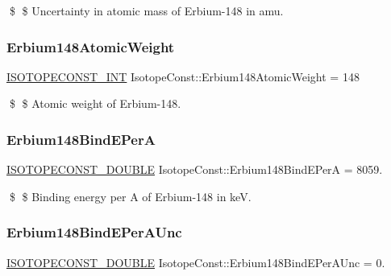 \$ \$ Uncertainty in atomic mass of Erbium-\/148 in amu. \mbox{\label{group___isotope_const-_erbium-_er148_ga8ebb9aed43184fc37fa10e8beffe3fc6}} 
\subsubsection{\texorpdfstring{Erbium148\+Atomic\+Weight}{Erbium148AtomicWeight}}
{\footnotesize\ttfamily \mbox{\hyperlink{group___isotope_const-_macros_ga5f18360b3e99483a35c32d789e62621c}{I\+S\+O\+T\+O\+P\+E\+C\+O\+N\+S\+T\+\_\+\+I\+NT}} Isotope\+Const\+::\+Erbium148\+Atomic\+Weight = 148}

\$ \$ Atomic weight of Erbium-\/148. \mbox{\label{group___isotope_const-_erbium-_er148_gae39ef700fc05c36021930b5216ac6c9f}} 
\subsubsection{\texorpdfstring{Erbium148\+Bind\+E\+PerA}{Erbium148BindEPerA}}
{\footnotesize\ttfamily \mbox{\hyperlink{group___isotope_const-_macros_ga8f45a7272ce02c0b4c65c44636ed719a}{I\+S\+O\+T\+O\+P\+E\+C\+O\+N\+S\+T\+\_\+\+D\+O\+U\+B\+LE}} Isotope\+Const\+::\+Erbium148\+Bind\+E\+PerA = 8059.}

\$ \$ Binding energy per A of Erbium-\/148 in keV. \mbox{\label{group___isotope_const-_erbium-_er148_ga1b3cae448fda03b55c8aa55d6174a9e2}} 
\subsubsection{\texorpdfstring{Erbium148\+Bind\+E\+Per\+A\+Unc}{Erbium148BindEPerAUnc}}
{\footnotesize\ttfamily \mbox{\hyperlink{group___isotope_const-_macros_ga8f45a7272ce02c0b4c65c44636ed719a}{I\+S\+O\+T\+O\+P\+E\+C\+O\+N\+S\+T\+\_\+\+D\+O\+U\+B\+LE}} Isotope\+Const\+::\+Erbium148\+Bind\+E\+Per\+A\+Unc = 0.}

